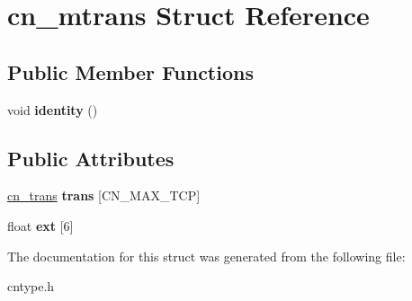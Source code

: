 \hypertarget{structcn__mtrans}{\section{cn\-\_\-mtrans Struct Reference}
\label{structcn__mtrans}
}
\subsection*{Public Member Functions}
\begin{DoxyCompactItemize}
\item 
\hypertarget{structcn__mtrans_a515ed74b1fc5ec2c55edeaa012febe27}{void {\bfseries identity} ()}\label{structcn__mtrans_a515ed74b1fc5ec2c55edeaa012febe27}

\end{DoxyCompactItemize}
\subsection*{Public Attributes}
\begin{DoxyCompactItemize}
\item 
\hypertarget{structcn__mtrans_ac117ba2be7971dbf1f57da3e374472ae}{\hyperlink{structcn__trans}{cn\-\_\-trans} {\bfseries trans} \mbox{[}C\-N\-\_\-\-M\-A\-X\-\_\-\-T\-C\-P\mbox{]}}\label{structcn__mtrans_ac117ba2be7971dbf1f57da3e374472ae}

\item 
\hypertarget{structcn__mtrans_a248ffcb9f2cf35ff2c696b804a174892}{float {\bfseries ext} \mbox{[}6\mbox{]}}\label{structcn__mtrans_a248ffcb9f2cf35ff2c696b804a174892}

\end{DoxyCompactItemize}


The documentation for this struct was generated from the following file\-:\begin{DoxyCompactItemize}
\item 
cntype.\-h\end{DoxyCompactItemize}
